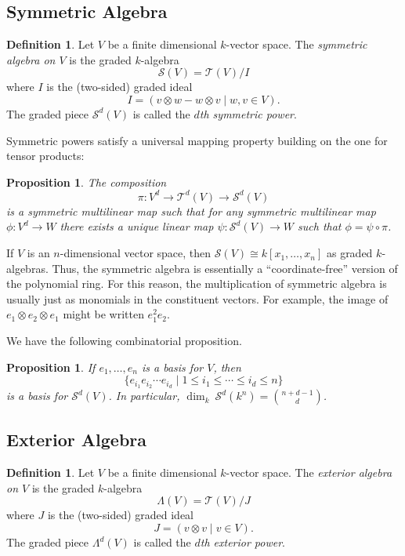 \documentclass[12pt]{article}
\theoremstyle{plain}
\newtheorem{proposition}[theorem]{Proposition}
\theoremstyle{definition}
\newtheorem{definition}[theorem]{Definition}
\theoremstyle{remark}
\numberwithin{equation}{section}
\begin{document}
\subsection{Symmetric Algebra}

\begin{definition}
Let $V$ be a finite dimensional $k$-vector space.
The \emph{symmetric algebra on $V$} is the graded $k$-algebra
\[
\mathcal{S}(V) = \mathcal{T}(V)/I
\]
where $I$ is the (two-sided) graded ideal
\[
I = ( v \otimes w - w \otimes v \mid w,v \in V ).
\]
The graded piece $\mathcal{S}^d(V)$ is called the
\emph{$d$th symmetric power}.
\end{definition}

Symmetric powers satisfy a universal mapping property building on the
one for tensor products:

\begin{proposition}
The composition
\[
\pi : V^d \to \mathcal{T}^d(V) \to \mathcal{S}^d(V)
\]
is a symmetric multilinear map such that for any
symmetric multilinear map
$\phi : V^d \to W$ there exists a unique linear map
$\psi : \mathcal{S}^d(V) \to W$
such that
$\phi = \psi \circ \pi$.
\end{proposition}

If $V$ is an $n$-dimensional vector space, then
$\mathcal{S}(V) \cong k[x_1,\ldots,x_n]$ as graded $k$-algebras.
Thus, the symmetric algebra is essentially a ``coordinate-free'' version of
the polynomial ring.
For this reason, the multiplication of symmetric algebra is usually just
as monomials in the constituent vectors.
For example, the image of $e_1 \otimes e_2 \otimes e_1$ might be
written $e_1^2e_2$.

We have the following combinatorial proposition.

\begin{proposition}
If $e_1, \ldots, e_n$ is a basis for $V$, then
\[
\{
e_{i_1}e_{i_2} \cdots e_{i_d}
\mid
1 \le i_1 \le \cdots \le i_d \le n
\}
\]
is a basis for $\mathcal{S}^d(V)$.
In particular, $\dim_k\ \mathcal{S}^d(k^n)=\binom{n+d-1}{d}$.
\end{proposition}

\subsection{Exterior Algebra}

\begin{definition}
Let $V$ be a finite dimensional $k$-vector space.
The \emph{exterior algebra on $V$} is the graded $k$-algebra
\[
\Lambda(V) = \mathcal{T}(V)/J
\]
where $J$ is the (two-sided) graded ideal
\[
J = ( v \otimes v \mid v \in V ).
\]
The graded piece $\Lambda^d(V)$ is called the
\emph{$d$th exterior power}.
\end{definition}
\end{document}
